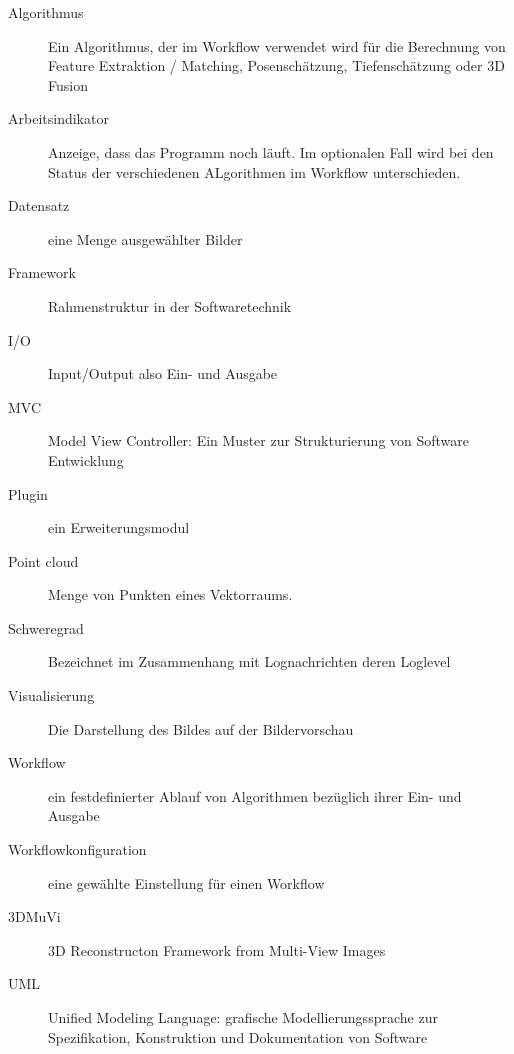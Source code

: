 
\begin{description}
	\item[Algorithmus] Ein Algorithmus, der im Workflow verwendet wird für die Berechnung von Feature Extraktion / Matching, Posenschätzung, Tiefenschätzung oder 3D Fusion
	\item[Arbeitsindikator] Anzeige, dass das Programm noch läuft. Im optionalen Fall wird bei den Status der verschiedenen ALgorithmen im Workflow unterschieden.
	\item [Datensatz] eine Menge ausgewählter Bilder
	\item[Framework] Rahmenstruktur in der Softwaretechnik
	\item[I/O] Input/Output also Ein- und Ausgabe
	\item[MVC] Model View Controller: Ein Muster zur Strukturierung von Software Entwicklung
	\item[Plugin] ein Erweiterungsmodul 
	\item[Point cloud] Menge von Punkten eines Vektorraums.
	\item[Schweregrad] Bezeichnet im Zusammenhang mit Lognachrichten deren Loglevel
	\item[Visualisierung] Die Darstellung des Bildes auf der Bildervorschau
	\item [Workflow] ein festdefinierter Ablauf von Algorithmen bezüglich ihrer Ein- und Ausgabe
	\item [Workflowkonfiguration] eine gewählte Einstellung für einen Workflow
	\item[3DMuVi] 3D Reconstructon Framework from Multi-View Images
	\item[UML] Unified Modeling Language: grafische Modellierungssprache zur Spezifikation, Konstruktion und Dokumentation von Software
\end{description}
